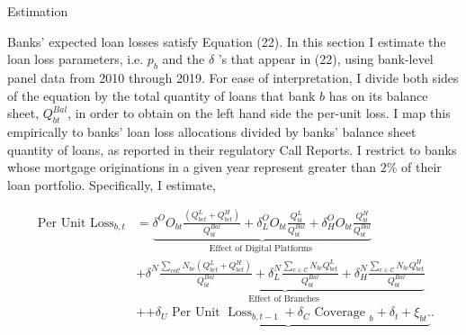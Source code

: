 \documentclass[notes,10pt, aspectratio=169]{beamer}
\newenvironment{wideitemize}{\itemize\addtolength{\itemsep}{10pt}}{\enditemize}
\begin{document}
\begin{frame}{Estimation}

        \vspace{0.3cm}
        \begin{wideitemize}
            \item Banks' expected loan losses satisfy Equation (22). In this section I estimate the loan loss parameters, i.e. $p_b$ and the $\delta$ 's that appear in (22), using bank-level panel data from 2010 through 2019. For ease of interpretation, I divide both sides of the equation by the total quantity of loans that bank $b$ has on its balance sheet, $Q_{b t}^{B a l}$, in order to obtain on the left hand side the per-unit loss. I map this empirically to banks' loan loss allocations divided by banks' balance sheet quantity of loans, as reported in their regulatory Call Reports. I restrict to banks whose mortgage originations in a given year represent greater than $2 \%$ of their loan portfolio. Specifically, I estimate,

            $$
            \begin{aligned}
            \text { Per Unit } \operatorname{Loss}_{b, t} & =\underbrace{\delta^O O_{b t} \frac{\left(Q_{b c t}^L+Q_{b c t}^H\right)}{Q_{b t}^{B a l}}+\delta_L^O O_{b t} \frac{Q_{b t}^L}{Q_{b t}^{B a l}}+\delta_H^O O_{b t} \frac{Q_{b t}^H}{Q_{b t}^{B a l}}}_{\text {Effect of Digital Platforms }} \\
            & +\underbrace{\delta^N \frac{\sum_{c c \mathcal{C}} N_{b c}\left(Q_{b c t}^L+Q_{b c t}^H\right)}{Q_{b t}^{B a l}}+\delta_L^N \frac{\sum_{c \in \mathcal{C}} N_{b c} Q_{b c t}^L}{Q_{b t}^{B a l}}+\delta_H^N \frac{\sum_{c \in \mathcal{C}} N_{b c} Q_{b c t}^H}{Q_{b t}^{B a l}}}_{\text {Effect of Branches }} \\
            & +\underbrace{+\delta_U \text { Per Unit } \operatorname{Loss}_{b, t-1}+\delta_C \text { Coverage }_b+\delta_t+\xi_{b t} .} .
            \end{aligned}
            $$
       
    \end{wideitemize}

\end{frame}
\end{document}
